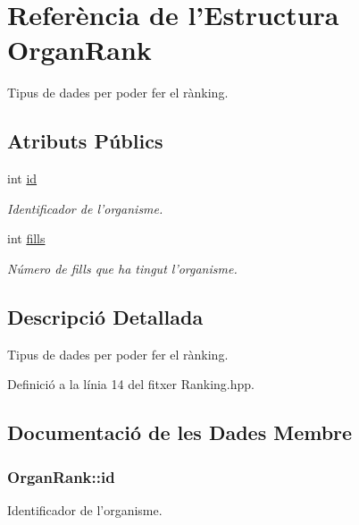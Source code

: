 \hypertarget{struct_organ_rank}{\section{Referència de l'Estructura Organ\-Rank}
\label{struct_organ_rank}
}


Tipus de dades per poder fer el rànking.  


\subsection*{Atributs Públics}
\begin{DoxyCompactItemize}
\item 
int \hyperlink{struct_organ_rank_a4c2294bdeab2be3ce7e6142687a0542c}{id}
\begin{DoxyCompactList}\small\item\em Identificador de l'organisme. \end{DoxyCompactList}\item 
int \hyperlink{struct_organ_rank_ac822919ccf32979e8c4d8384a1949b08}{fills}
\begin{DoxyCompactList}\small\item\em Número de fills que ha tingut l'organisme. \end{DoxyCompactList}\end{DoxyCompactItemize}


\subsection{Descripció Detallada}
Tipus de dades per poder fer el rànking. 

Definició a la línia 14 del fitxer Ranking.\-hpp.



\subsection{Documentació de les Dades Membre}
\hypertarget{struct_organ_rank_a4c2294bdeab2be3ce7e6142687a0542c}{
\subsubsection[{id}]{\setlength{\rightskip}{0pt plus 5cm}Organ\-Rank\-::id}}\label{struct_organ_rank_a4c2294bdeab2be3ce7e6142687a0542c}


Identificador de l'organisme. 



